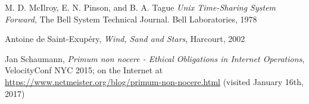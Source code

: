 \begin{thebibliography}{99}
M. D. McIlroy, E. N. Pinson, and B. A.
Tague {\em Unix Time-Sharing System Forward}, The Bell System Technical
Journal. Bell Laboratories, 1978

Antoine de
Saint-Exup\'{e}ry, {\em Wind, Sand and Stars},
Harcourt, 2002

Jan Schaumann, {\em
Primum non nocere - Ethical Obligations in Internet
Operations}, VelocityConf NYC 2015; on the Internet at
\url{https://www.netmeister.org/blog/primum-non-nocere.html}
(visited January 16th, 2017)

\end{thebibliography}
